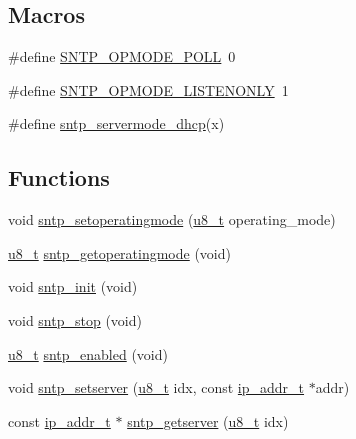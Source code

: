 \subsection*{Macros}
\begin{DoxyCompactItemize}
\item 
\#define \hyperlink{openmote-cc2538_2lwip_2src_2include_2lwip_2apps_2sntp_8h_a3fb5749307bfe9d99a97f80fc49c2720}{S\+N\+T\+P\+\_\+\+O\+P\+M\+O\+D\+E\+\_\+\+P\+O\+LL}~0
\item 
\#define \hyperlink{openmote-cc2538_2lwip_2src_2include_2lwip_2apps_2sntp_8h_a55c14213293bd91ff0a55760bd77bb06}{S\+N\+T\+P\+\_\+\+O\+P\+M\+O\+D\+E\+\_\+\+L\+I\+S\+T\+E\+N\+O\+N\+LY}~1
\item 
\#define \hyperlink{openmote-cc2538_2lwip_2src_2include_2lwip_2apps_2sntp_8h_afe7b6eae76f608a87fadc3940c5ee4f9}{sntp\+\_\+servermode\+\_\+dhcp}(x)
\end{DoxyCompactItemize}
\subsection*{Functions}
\begin{DoxyCompactItemize}
\item 
void \hyperlink{openmote-cc2538_2lwip_2src_2include_2lwip_2apps_2sntp_8h_aae94fb2adadbf9667e9597f8a45bf120}{sntp\+\_\+setoperatingmode} (\hyperlink{group__compiler__abstraction_ga4caecabca98b43919dd11be1c0d4cd8e}{u8\+\_\+t} operating\+\_\+mode)
\item 
\hyperlink{group__compiler__abstraction_ga4caecabca98b43919dd11be1c0d4cd8e}{u8\+\_\+t} \hyperlink{openmote-cc2538_2lwip_2src_2include_2lwip_2apps_2sntp_8h_ae66404a551d5cef420cf844a71356fae}{sntp\+\_\+getoperatingmode} (void)
\item 
void \hyperlink{openmote-cc2538_2lwip_2src_2include_2lwip_2apps_2sntp_8h_a9b300c6616de60524c85ea40bf70e2ba}{sntp\+\_\+init} (void)
\item 
void \hyperlink{openmote-cc2538_2lwip_2src_2include_2lwip_2apps_2sntp_8h_a8119fc2d1ff7ff6eba511cc9c7167488}{sntp\+\_\+stop} (void)
\item 
\hyperlink{group__compiler__abstraction_ga4caecabca98b43919dd11be1c0d4cd8e}{u8\+\_\+t} \hyperlink{openmote-cc2538_2lwip_2src_2include_2lwip_2apps_2sntp_8h_a3fe5254e5a056fca80802d9f26b9c3c5}{sntp\+\_\+enabled} (void)
\item 
void \hyperlink{openmote-cc2538_2lwip_2src_2include_2lwip_2apps_2sntp_8h_ab653cfecd7e9826634fbea1b839c6554}{sntp\+\_\+setserver} (\hyperlink{group__compiler__abstraction_ga4caecabca98b43919dd11be1c0d4cd8e}{u8\+\_\+t} idx, const \hyperlink{native_2lwip_2src_2include_2lwip_2ip__addr_8h_a88b43639738c4de2d3cd22e3a1fd7696}{ip\+\_\+addr\+\_\+t} $\ast$addr)
\item 
const \hyperlink{native_2lwip_2src_2include_2lwip_2ip__addr_8h_a88b43639738c4de2d3cd22e3a1fd7696}{ip\+\_\+addr\+\_\+t} $\ast$ \hyperlink{openmote-cc2538_2lwip_2src_2include_2lwip_2apps_2sntp_8h_a2a28523cb9f2b5b025a4818bc2c1afc1}{sntp\+\_\+getserver} (\hyperlink{group__compiler__abstraction_ga4caecabca98b43919dd11be1c0d4cd8e}{u8\+\_\+t} idx)
\end{DoxyCompactItemize}


